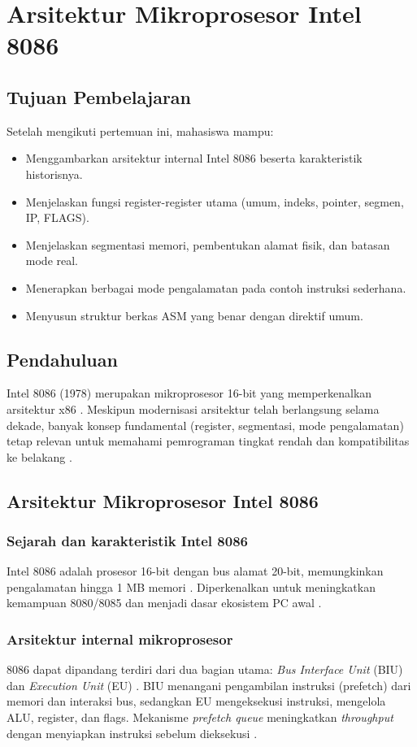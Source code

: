 \chapter{Arsitektur Mikroprosesor Intel 8086}

\section{Tujuan Pembelajaran}
Setelah mengikuti pertemuan ini, mahasiswa mampu:
\begin{itemize}
    \item Menggambarkan arsitektur internal Intel 8086 beserta karakteristik historisnya.
    \item Menjelaskan fungsi register-register utama (umum, indeks, pointer, segmen, IP, FLAGS).
    \item Menjelaskan segmentasi memori, pembentukan alamat fisik, dan batasan mode real.
    \item Menerapkan berbagai mode pengalamatan pada contoh instruksi sederhana.
    \item Menyusun struktur berkas ASM yang benar dengan direktif umum.
\end{itemize}

\section{Pendahuluan}
Intel 8086 (1978) merupakan mikroprosesor 16-bit yang memperkenalkan arsitektur x86 \cite{intel2019manual32}. Meskipun modernisasi arsitektur telah berlangsung selama dekade, banyak konsep fundamental (register, segmentasi, mode pengalamatan) tetap relevan untuk memahami pemrograman tingkat rendah dan kompatibilitas ke belakang \cite{brey1986mikroprosesor}.

\section{Arsitektur Mikroprosesor Intel 8086}
\subsection{Sejarah dan karakteristik Intel 8086}
Intel 8086 adalah prosesor 16-bit dengan bus alamat 20-bit, memungkinkan pengalamatan hingga 1 MB memori \cite{intel2019manual32}. Diperkenalkan untuk meningkatkan kemampuan 8080/8085 dan menjadi dasar ekosistem PC awal \cite{brey1986mikroprosesor}.

\subsection{Arsitektur internal mikroprosesor}
8086 dapat dipandang terdiri dari dua bagian utama: \textit{Bus Interface Unit} (BIU) dan \textit{Execution Unit} (EU) \cite{intel2019manual32}. BIU menangani pengambilan instruksi (prefetch) dari memori dan interaksi bus, sedangkan EU mengeksekusi instruksi, mengelola ALU, register, dan flags. Mekanisme \textit{prefetch queue} meningkatkan \textit{throughput} dengan menyiapkan instruksi sebelum dieksekusi \cite{brey1986mikroprosesor}.

